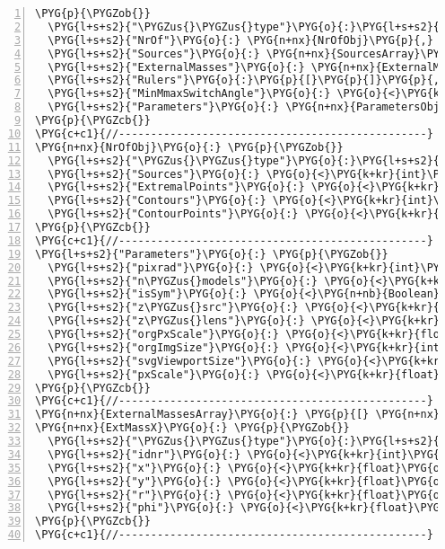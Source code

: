 \begin{Verbatim}[commandchars=\\\{\},numbers=left,stepnumber=1,codes={\catcode`\$=3\catcode`\^=7\catcode`\_=8}]
\PYG{p}{\PYGZob{}}
  \PYG{l+s+s2}{"\PYGZus{}\PYGZus{}type"}\PYG{o}{:}\PYG{l+s+s2}{"model"}\PYG{p}{,}
  \PYG{l+s+s2}{"NrOf"}\PYG{o}{:} \PYG{n+nx}{NrOfObj}\PYG{p}{,}
  \PYG{l+s+s2}{"Sources"}\PYG{o}{:} \PYG{n+nx}{SourcesArray}\PYG{p}{,}
  \PYG{l+s+s2}{"ExternalMasses"}\PYG{o}{:} \PYG{n+nx}{ExternalMassesArray}
  \PYG{l+s+s2}{"Rulers"}\PYG{o}{:}\PYG{p}{[}\PYG{p}{]}\PYG{p}{,}
  \PYG{l+s+s2}{"MinMmaxSwitchAngle"}\PYG{o}{:} \PYG{o}{<}\PYG{k+kr}{float}\PYG{o}{>}\PYG{p}{,}
  \PYG{l+s+s2}{"Parameters"}\PYG{o}{:} \PYG{n+nx}{ParametersObj}
\PYG{p}{\PYGZcb{}}
\PYG{c+c1}{//------------------------------------------------}
\PYG{n+nx}{NrOfObj}\PYG{o}{:} \PYG{p}{\PYGZob{}}
  \PYG{l+s+s2}{"\PYGZus{}\PYGZus{}type"}\PYG{o}{:}\PYG{l+s+s2}{"counters"}\PYG{p}{,}
  \PYG{l+s+s2}{"Sources"}\PYG{o}{:} \PYG{o}{<}\PYG{k+kr}{int}\PYG{o}{>}\PYG{p}{,}
  \PYG{l+s+s2}{"ExtremalPoints"}\PYG{o}{:} \PYG{o}{<}\PYG{k+kr}{int}\PYG{o}{>}\PYG{p}{,}
  \PYG{l+s+s2}{"Contours"}\PYG{o}{:} \PYG{o}{<}\PYG{k+kr}{int}\PYG{o}{>}\PYG{p}{,}
  \PYG{l+s+s2}{"ContourPoints"}\PYG{o}{:} \PYG{o}{<}\PYG{k+kr}{int}\PYG{o}{>}
\PYG{p}{\PYGZcb{}}
\PYG{c+c1}{//------------------------------------------------}
\PYG{l+s+s2}{"Parameters"}\PYG{o}{:} \PYG{p}{\PYGZob{}}
  \PYG{l+s+s2}{"pixrad"}\PYG{o}{:} \PYG{o}{<}\PYG{k+kr}{int}\PYG{o}{>}\PYG{p}{,}
  \PYG{l+s+s2}{"n\PYGZus{}models"}\PYG{o}{:} \PYG{o}{<}\PYG{k+kr}{int}\PYG{o}{>}\PYG{p}{,}
  \PYG{l+s+s2}{"isSym"}\PYG{o}{:} \PYG{o}{<}\PYG{n+nb}{Boolean}\PYG{o}{>}\PYG{p}{,}
  \PYG{l+s+s2}{"z\PYGZus{}src"}\PYG{o}{:} \PYG{o}{<}\PYG{k+kr}{int}\PYG{o}{>}\PYG{p}{,}
  \PYG{l+s+s2}{"z\PYGZus{}lens"}\PYG{o}{:} \PYG{o}{<}\PYG{k+kr}{float}\PYG{o}{>}\PYG{p}{,}
  \PYG{l+s+s2}{"orgPxScale"}\PYG{o}{:} \PYG{o}{<}\PYG{k+kr}{float}\PYG{o}{>}\PYG{p}{,}
  \PYG{l+s+s2}{"orgImgSize"}\PYG{o}{:} \PYG{o}{<}\PYG{k+kr}{int}\PYG{o}{>}\PYG{p}{,}
  \PYG{l+s+s2}{"svgViewportSize"}\PYG{o}{:} \PYG{o}{<}\PYG{k+kr}{int}\PYG{o}{>}\PYG{p}{,}
  \PYG{l+s+s2}{"pxScale"}\PYG{o}{:} \PYG{o}{<}\PYG{k+kr}{float}\PYG{o}{>}
\PYG{p}{\PYGZcb{}}
\PYG{c+c1}{//------------------------------------------------}
\PYG{n+nx}{ExternalMassesArray}\PYG{o}{:} \PYG{p}{[} \PYG{n+nx}{ExtMass1}\PYG{p}{,} \PYG{n+nx}{ExtMass2}\PYG{p}{,} \PYG{p}{.}\PYG{p}{.}\PYG{p}{.}\PYG{p}{]}
\PYG{n+nx}{ExtMassX}\PYG{o}{:} \PYG{p}{\PYGZob{}}
  \PYG{l+s+s2}{"\PYGZus{}\PYGZus{}type"}\PYG{o}{:}\PYG{l+s+s2}{"ext\PYGZus{}mass"}\PYG{p}{,}
  \PYG{l+s+s2}{"idnr"}\PYG{o}{:} \PYG{o}{<}\PYG{k+kr}{int}\PYG{o}{>}\PYG{p}{,}
  \PYG{l+s+s2}{"x"}\PYG{o}{:} \PYG{o}{<}\PYG{k+kr}{float}\PYG{o}{>}\PYG{p}{,}
  \PYG{l+s+s2}{"y"}\PYG{o}{:} \PYG{o}{<}\PYG{k+kr}{float}\PYG{o}{>}\PYG{p}{,}
  \PYG{l+s+s2}{"r"}\PYG{o}{:} \PYG{o}{<}\PYG{k+kr}{float}\PYG{o}{>}\PYG{p}{,}
  \PYG{l+s+s2}{"phi"}\PYG{o}{:} \PYG{o}{<}\PYG{k+kr}{float}\PYG{o}{>}\PYG{p}{,}
\PYG{p}{\PYGZcb{}}
\PYG{c+c1}{//------------------------------------------------}
\end{Verbatim}
